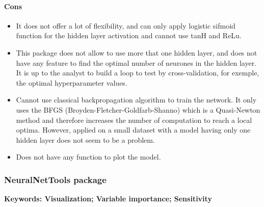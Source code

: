 \documentclass[6pt,letter]{article}\usepackage[]{graphicx}\usepackage[]{color}
\begin{document}
\paragraph{Cons}
\begin{itemize}
\item It does not offer a lot of flexibility, and can only apply logistic sifmoid function for the hidden layer activation and cannot use tanH and ReLu.
\item This package does not allow to use more that one hidden layer, and does not have any feature to find the optimal number of neurones in the hidden layer. It is up to the analyst to build a loop to test by cross-validation, for exemple, the optimal hyperparameter values.
\item Cannot use classical backpropagation algorithm to train the network. It only uses the BFGS (Broyden-Fletcher-Goldfarb-Shanno) which is a Quasi-Newton method and therefore increases the number of computation to reach a local optima. However, applied on a small dataset with a model having only one hidden layer does not seem to be a problem.
\item Does not have any function to plot the model.
\end{itemize}


\subsubsection{NeuralNetTools package}
\textbf{Keywords: Visualization; Variable importance; Sensitivity}
\end{document}

